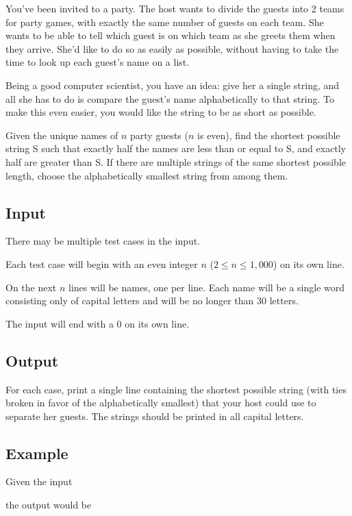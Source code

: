 

You've been invited to a party. The host wants to divide the guests
into 2 teams for party games, with exactly the same number of guests
on each team. She wants to be able to tell which guest is on which
team as she greets them when they arrive. She'd like to do so as
easily as possible, without having to take the time to look up each
guest's name on a list.

Being a good computer scientist, you have an idea: give her a single
string, and all she has to do is compare the guest's name
alphabetically to that string. To make this
even easier, you would like the string to be as short as possible.

Given the unique names of $n$ party guests ($n$ is even), find the
shortest possible string S such that exactly half the names are less
than or equal to S, and exactly half are greater than S. If there are
multiple strings of the same shortest possible length, choose the
alphabetically smallest string from among them.

\subsection*{Input}

There may be multiple test cases in the input. 

Each test case will begin with an even integer $n$ ($2\leq n\leq
1,000$) on its own line.

On the next $n$ lines will be names, one per line. Each name will be a
single word consisting only of capital letters and will be no longer
than 30 letters. 

The input will end with a 0 on its own line.

\subsection*{Output}

For each case, print a single line containing the shortest possible
string (with ties broken in favor of the alphabetically smallest) that
your host could use to separate her guests. The strings should be
printed in all capital letters.

\subsection*{Example}

Given the input

the output would be
